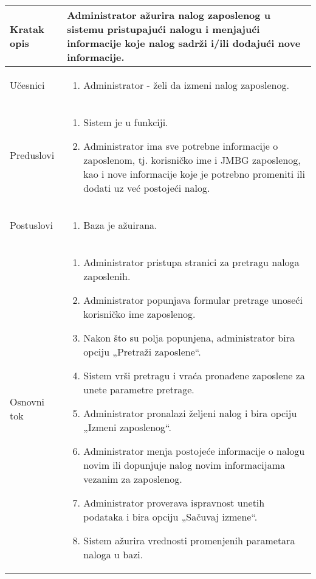 \documentclass[../main.tex]{subfiles}
\begin{document}
\begin{longtable}{| p{} | p{} |} 

\hline
    Kratak opis &  Administrator ažurira nalog zaposlenog u sistemu pristupajući nalogu i menjajući informacije koje nalog sadrži i/ili dodajući nove informacije.\\ 
\hline    
    Učesnici & 
    	\begin{enumerate}
        \item Administrator - želi da izmeni nalog zaposlenog.
     \end{enumerate}\\
\hline
   Preduslovi & \begin{enumerate}
       \item Sistem je u funkciji.
       \item Administrator ima sve potrebne informacije o zaposlenom, tj. korisničko ime i JMBG zaposlenog, kao i nove informacije koje je potrebno promeniti ili dodati uz već postojeći nalog.
   \end{enumerate}\\
\hline  
    Postuslovi & \begin{enumerate}
        \item Baza je ažuirana.
    \end{enumerate}\\
\hline
    Osnovni tok & \begin{enumerate}
        \item Administrator pristupa stranici za pretragu naloga zaposlenih.
        \item Administrator popunjava formular pretrage unoseći korisničko ime zaposlenog.
        \item Nakon što su polja popunjena, administrator bira opciju „Pretraži zaposlene“.
        \item Sistem vrši pretragu i vraća pronađene zaposlene za unete parametre pretrage.
        \item Administrator pronalazi željeni nalog i bira opciju „Izmeni zaposlenog“.
        \item Administrator menja postojeće informacije o nalogu novim ili dopunjuje nalog novim informacijama vezanim za zaposlenog.
        \item Administrator proverava ispravnost unetih podataka i bira opciju „Sačuvaj izmene“.
        \item Sistem ažurira vrednosti promenjenih parametara naloga u bazi.

\end{enumerate}
\end{longtable}
\end{document}
